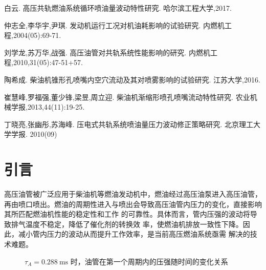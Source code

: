 \documentclass{cumcmthesis}
\newcommand{\tim}{~\mathrm{ms}}
\newcommand{\pres}{/\mathrm{kPa}}
\newcommand{\tims}{/\mathrm{ms}}
\begin{document}
\begin{thebibliography}{9}%
    白云.
    \newblock 高压共轨燃油系统循环喷油量波动特性研究\allowbreak[D].
    \newblock 哈尔滨工程大学,2017.

    仲志全,李华宇,尹琪.
    \newblock 发动机运行工况对机油耗影响的试验研究\allowbreak[J].
    \newblock 内燃机工程,2004(05):69-71.

    刘学龙,苏万华,战强.
    \newblock 高压油管对共轨系统性能影响的研究\allowbreak[J].
    \newblock 内燃机工程,2010,31(05):47-51+57.

    陶希成.
    \newblock 柴油机锥形孔喷嘴内空穴流动及其对喷雾影响的试验研究\allowbreak[D].
    \newblock 江苏大学,2016.

    崔慧峰,罗福强,董少锋,梁昱,周立迎.
    \newblock 柴油机渐缩形喷孔喷嘴流动特性研究\allowbreak[J].
    \newblock 农业机械学报,2013,44(11):19-25.

    丁晓亮,张幽彤,苏海峰. 
    \newblock 压电式共轨系统喷油量压力波动修正策略研究\allowbreak[J].
    \newblock 北京理工大学学报. 2010(09)
\end{thebibliography}

\section{引言}
高压油管被广泛应用于柴油机等燃油发动机中，燃油经过高压油泵进入高压油管，
再由喷口喷出。燃油的周期性进入与喷出会导致高压油管内压力的变化，直接影响其所匹配燃油机性能的稳定性和工作
的可靠性。具体而言，管内压强的波动将导致排气温度不稳定，降低了催化剂的转换效
率，使燃油机排放一致性下降。因此，减小管内压力的波动从而提升工作效率，是当前高压燃油系统亟需
解决的技术难题。






\begin{figure}[!ht]
	\centering
	\caption{$\tau_A=0.288\tim$ 时，油管在第一个周期内的压强随时间的变化关系}
	\label{firstperiodPt}
\end{figure}
\end{document}
